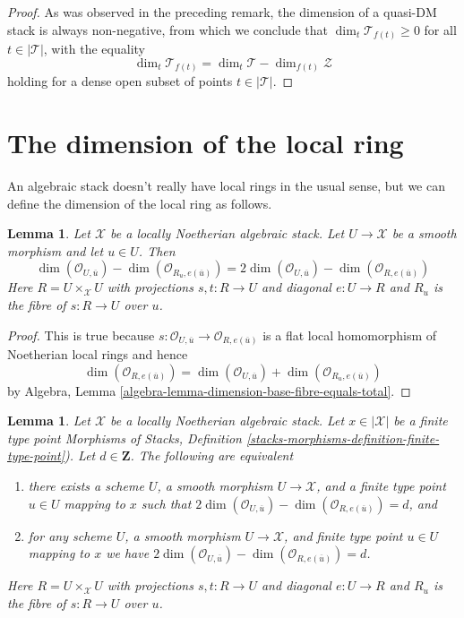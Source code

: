 \documentclass{stacks-project}
\theoremstyle{plain}
\newtheorem{lemma}[subsection]{Lemma}
\theoremstyle{definition}
\theoremstyle{remark}
\numberwithin{equation}{subsection}
\begin{document}
\begin{proof}
As was observed in the preceding remark,
the dimension of a quasi-DM stack is always non-negative,
from which we conclude that $\dim_t \mathcal{T}_{f(t)} \geq 0$
for all $t \in |\mathcal{T}|$, with the equality
$$
\dim_t \mathcal{T}_{f(t)} = \dim_t \mathcal{T} - \dim_{f(t)} \mathcal{Z}
$$
holding
for a dense open subset of points $t\in |\mathcal{T}|$.
\end{proof}





\section{The dimension of the local ring}
\label{section-dimension-local-ring}

\noindent
An algebraic stack doesn't really have local rings in the usual sense,
but we can define the dimension of the local ring as follows.

\begin{lemma}
\label{lemma-dimension-local-ring-pre}
Let $\mathcal{X}$ be a locally Noetherian algebraic stack.
Let $U \to \mathcal{X}$ be a smooth morphism and let $u \in U$.
Then
$$
\dim(\mathcal{O}_{U, \overline{u}}) -
\dim(\mathcal{O}_{R_u, e(\overline{u})}) =
2\dim(\mathcal{O}_{U, \overline{u}}) -
\dim(\mathcal{O}_{R, e(\overline{u})})
$$
Here $R = U \times_\mathcal{X} U$ with projections $s, t : R \to U$ and
diagonal $e : U \to R$ and $R_u$ is the fibre of $s : R \to U$ over $u$.
\end{lemma}

\begin{proof}
This is true because
$s : \mathcal{O}_{U, \overline{u}} \to \mathcal{O}_{R, e(\overline{u})}$
is a flat local homomorphism of Noetherian local rings and hence
$$
\dim(\mathcal{O}_{R, e(\overline{u})}) =
\dim(\mathcal{O}_{U, \overline{u}}) +
\dim(\mathcal{O}_{R_u, e(\overline{u})})
$$
by
Algebra, Lemma \ref{algebra-lemma-dimension-base-fibre-equals-total}.
\end{proof}

\begin{lemma}
\label{lemma-dimension-local-ring}
Let $\mathcal{X}$ be a locally Noetherian algebraic stack.
Let $x \in |\mathcal{X}|$ be a finite type point 
Morphisms of Stacks, Definition
\ref{stacks-morphisms-definition-finite-type-point}).
Let $d \in \mathbf{Z}$.
The following are equivalent
\begin{enumerate}
\item there exists a scheme $U$, a smooth morphism $U \to \mathcal{X}$,
and a finite type point $u \in U$ mapping to $x$ such that
$2\dim(\mathcal{O}_{U, \overline{u}}) -
\dim(\mathcal{O}_{R, e(\overline{u})}) = d$, and
\item for any scheme $U$, a smooth morphism $U \to \mathcal{X}$,
and finite type point $u \in U$ mapping to $x$ we have
$2\dim(\mathcal{O}_{U, \overline{u}}) -
\dim(\mathcal{O}_{R, e(\overline{u})}) = d$.
\end{enumerate}
Here $R = U \times_\mathcal{X} U$ with projections $s, t : R \to U$ and
diagonal $e : U \to R$ and $R_u$ is the fibre of $s : R \to U$ over $u$.
\end{lemma}
\end{document}
